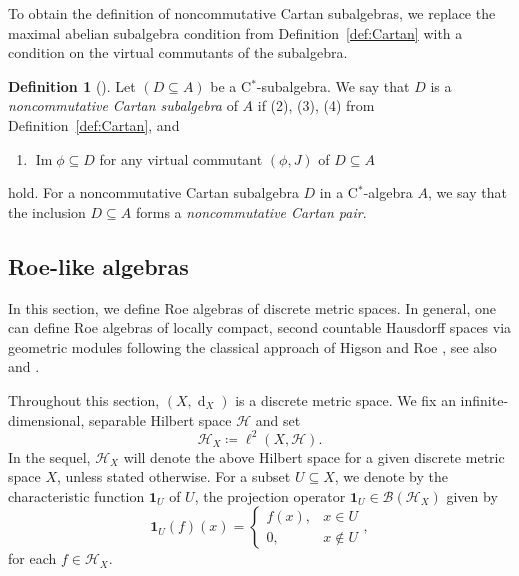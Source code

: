 \documentclass[a4paper]{amsart}
\newcommand{\myhyp}{\textnormal{-}\hskip0pt\relax}
\numberwithin{equation}{section}
\newcommand{\Bcal}{\mathcal{B}}
\newcommand{\Hcal}{\mathcal{H}}
\newcommand{\indF}{\mathbf{1}}
\newcommand{\cstar}{C$^\ast$\myhyp{}algebra}
\newcommand{\cstarSub}{C$^\ast$\myhyp{}subalgebra}
\newcommand{\bop}[1]{\Bcal({#1})}
\DeclareMathOperator{\img}{Im}
\DeclareMathOperator{\dist}{d}
\theoremstyle{plain}
\theoremstyle{indented}
\numberwithin{equation}{section}
\theoremstyle{definition}
\newtheorem{defin}[thm]{Definition}
\theoremstyle{remark}
\theoremstyle{plain}
\theoremstyle{definition}
\begin{document}
To obtain the definition of noncommutative Cartan subalgebras,
we replace the maximal abelian subalgebra condition from Definition~\ref{def:Cartan}
with a condition on the virtual commutants of the subalgebra.

\begin{defin}[{\cite{Exel2011noncommCartan, KwasniewskiMeyer2020NoncommutativeCartan}}]
    Let ${(D \subseteq A)}$ be a \cstarSub{}. We say that $D$ is a \emph{noncommutative Cartan subalgebra} of $A$ if 
    (2), (3), (4) from Definition~\ref{def:Cartan}, and
    \begin{enumerate}
        \item[(1')] ${\img{\phi} \subseteq D}$ for any virtual commutant ${(\phi,J)}$ of ${D \subseteq A}$
    \end{enumerate}
    hold.
    For a noncommutative Cartan subalgebra $D$ in a \cstar{} $A$, we say that the inclusion ${D\subseteq A}$ forms a \emph{noncommutative Cartan pair}.
\end{defin}


\medskip
\subsection{Roe-like algebras}

In this section, we define Roe algebras 
of discrete metric spaces.
In general, one can define Roe algebras of locally compact, second countable Hausdorff spaces
via geometric modules following
the classical approach of Higson and Roe \cite{HigsonRoe2000AnalyticKHomology},
see also \cite{WillettYu2020HigherIndexTheory} and \cite{MartinezVigolo2023RoeViaMods}.

Throughout this section, ${(X, \dist_X)}$ is a discrete metric space.
   We fix an infinite\myhyp{}dimensional, separable Hilbert space $\Hcal$ and set 
    \[{\Hcal_X \coloneq \ell^2(X, \Hcal)}.\]
    In the sequel, ${\Hcal_X}$ will denote the above Hilbert space for a given discrete metric space $X$, unless stated otherwise.
  For a subset ${U \subseteq X}$, we denote by the characteristic function $\indF_{U}$ of $U$, 
    the 
    projection operator ${\indF_{U} \in \bop{\Hcal_X}}$ given by
    \begin{equation*}
        \indF_{U}(f)(x) 
        =\begin{cases}
            f(x), &x\in U\\
            0, &x\notin U
        \end{cases},
    \end{equation*}
    for each ${f\in \Hcal_X}$.
\end{document}
